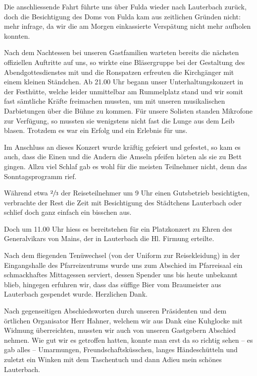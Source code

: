 \begin{history}
\begin{itemize}
        Die anschliessende Fahrt führte uns über Fulda wieder nach Lauterbach
        zurück, doch die Besichtigung des Doms von Fulda kam aus zeitlichen
        Gründen nicht: mehr infrage, da wir die am Morgen einkassierte
        Verspätung nicht mehr aufholen konnten.

        Nach dem Nachtessen bei unseren Gastfamilien warteten bereits die
        nächsten offiziellen Auftritte auf uns, so wirkte eine Bläsergruppe bei
        der Gestaltung des Abendgottesdienstes mit und die Ronspatzen erfreuten
        die Kirchgänger mit einem kleinen Ständchen. Ab 21.00 Uhr begann unser
        Unterhaltungskonzert in der Festhütte, welche leider unmittelbar am
        Rummelplatz stand und wir somit fast sämtliche Kräfte freimachen
        mussten, um mit unseren musikalischen Darbietungen über die Bühne zu
        kommen. Für unsere Solisten standen Mikrofone zur Verfügung, so mussten
        sie wenigstens nicht fast die Lunge aus dem Leib blasen. Trotzdem es war
        ein Erfolg und ein Erlebnis für uns.

        Im Anschluss an dieses Konzert wurde kräftig gefeiert und gefestet, so
        kam es auch, dass die Einen und die Andern die Amseln pfeifen hörten als
        sie zu Bett gingen. Allzu viel Schlaf gab es wohl für die meisten
        Teilnehmer nicht, denn das Sonntagsprogramm rief.

        Während etwa $\sfrac{2}{3}$ der Reiseteilnehmer um 9 Uhr einen
        Gutsbetrieb besichtigten, verbrachte der Rest die Zeit mit Besichtigung
        des Städtchens Lauterbach oder schlief doch ganz einfach ein bisschen
        aus.

        Doch um 11.00 Uhr hiess es bereitstehen für ein Platzkonzert zu Ehren
        des Generalvikars von Mains, der in Lauterbach die Hl. Firmung erteilte.

        Nach dem fliegenden Tenüwechsel (von der Uniform zur Reisekleidung) in
        der Eingangshalle des Pfarreizentrums wurde uns zum Abschied im
        Pfarreisaal ein schmackhaftes Mittagessen serviert, dessen Spender uns
        bis heute unbekannt blieb, hingegen erfuhren wir, dass das süffige Bier
        vom Braumeister aus Lauterbach gespendet wurde. Herzlichen Dank.

        Nach gegenseitigen Abschiedsworten durch unseren Präsidenten und dem
        örtlichen Organisator Herr Hahner, welchem wir aus Dank eine Kuhglocke
        mit Widmung überreichten, mussten wir auch von unseren Gastgebern
        Abschied nehmen. Wie gut wir es getroffen hatten, konnte man erst da so
        richtig sehen -- es gab alles -- Umarmungen, Freundschaftsküsschen,
        langes Händeschütteln und zuletzt ein Winken mit dem Taschentuch und
        dann Adieu mein schönes Lauterbach.


\end{itemize}
\end{history}
